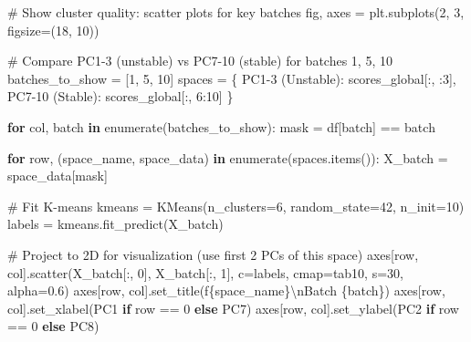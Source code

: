 \documentclass[
  letterpaper,
  DIV=11,
  numbers=noendperiod]{scrartcl}
\newenvironment{Shaded}{\begin{snugshade}}{\end{snugshade}}
\newcommand{\BuiltInTok}[1]{\textcolor[rgb]{0.00,0.23,0.31}{#1}}
\newcommand{\CharTok}[1]{\textcolor[rgb]{0.13,0.47,0.30}{#1}}
\newcommand{\CommentTok}[1]{\textcolor[rgb]{0.37,0.37,0.37}{#1}}
\newcommand{\ControlFlowTok}[1]{\textcolor[rgb]{0.00,0.23,0.31}{\textbf{#1}}}
\newcommand{\DecValTok}[1]{\textcolor[rgb]{0.68,0.00,0.00}{#1}}
\newcommand{\FloatTok}[1]{\textcolor[rgb]{0.68,0.00,0.00}{#1}}
\newcommand{\KeywordTok}[1]{\textcolor[rgb]{0.00,0.23,0.31}{\textbf{#1}}}
\newcommand{\NormalTok}[1]{\textcolor[rgb]{0.00,0.23,0.31}{#1}}
\newcommand{\OperatorTok}[1]{\textcolor[rgb]{0.37,0.37,0.37}{#1}}
\newcommand{\SpecialCharTok}[1]{\textcolor[rgb]{0.37,0.37,0.37}{#1}}
\newcommand{\SpecialStringTok}[1]{\textcolor[rgb]{0.13,0.47,0.30}{#1}}
\newcommand{\StringTok}[1]{\textcolor[rgb]{0.13,0.47,0.30}{#1}}
\renewenvironment{Shaded}{%
  \begin{tcolorbox}[%
    enhanced,%
    colback=codebg,%
    colframe=codebg,%
    borderline west={3pt}{0pt}{sectionblue},%
    fontupper=\small\ttfamily,%
    boxrule=0pt,%
    arc=0pt,%
    boxsep=5pt,%
    left=2mm,%
    right=2mm,%
    top=2mm,%
    bottom=2mm%
  ]%
}{%
  \end{tcolorbox}%
}
\begin{document}
\begin{Shaded}
\begin{Highlighting}[]
\CommentTok{\# Show cluster quality: scatter plots for key batches}
\NormalTok{fig, axes }\OperatorTok{=}\NormalTok{ plt.subplots(}\DecValTok{2}\NormalTok{, }\DecValTok{3}\NormalTok{, figsize}\OperatorTok{=}\NormalTok{(}\DecValTok{18}\NormalTok{, }\DecValTok{10}\NormalTok{))}

\CommentTok{\# Compare PC1{-}3 (unstable) vs PC7{-}10 (stable) for batches 1, 5, 10}
\NormalTok{batches\_to\_show }\OperatorTok{=}\NormalTok{ [}\DecValTok{1}\NormalTok{, }\DecValTok{5}\NormalTok{, }\DecValTok{10}\NormalTok{]}
\NormalTok{spaces }\OperatorTok{=}\NormalTok{ \{}
    \StringTok{\textquotesingle{}PC1{-}3 (Unstable)\textquotesingle{}}\NormalTok{: scores\_global[:, :}\DecValTok{3}\NormalTok{],}
    \StringTok{\textquotesingle{}PC7{-}10 (Stable)\textquotesingle{}}\NormalTok{: scores\_global[:, }\DecValTok{6}\NormalTok{:}\DecValTok{10}\NormalTok{]}
\NormalTok{\}}

\ControlFlowTok{for}\NormalTok{ col, batch }\KeywordTok{in} \BuiltInTok{enumerate}\NormalTok{(batches\_to\_show):}
\NormalTok{    mask }\OperatorTok{=}\NormalTok{ df[}\StringTok{\textquotesingle{}batch\textquotesingle{}}\NormalTok{] }\OperatorTok{==}\NormalTok{ batch}
    
    \ControlFlowTok{for}\NormalTok{ row, (space\_name, space\_data) }\KeywordTok{in} \BuiltInTok{enumerate}\NormalTok{(spaces.items()):}
\NormalTok{        X\_batch }\OperatorTok{=}\NormalTok{ space\_data[mask]}
        
        \CommentTok{\# Fit K{-}means}
\NormalTok{        kmeans }\OperatorTok{=}\NormalTok{ KMeans(n\_clusters}\OperatorTok{=}\DecValTok{6}\NormalTok{, random\_state}\OperatorTok{=}\DecValTok{42}\NormalTok{, n\_init}\OperatorTok{=}\DecValTok{10}\NormalTok{)}
\NormalTok{        labels }\OperatorTok{=}\NormalTok{ kmeans.fit\_predict(X\_batch)}
        
        \CommentTok{\# Project to 2D for visualization (use first 2 PCs of this space)}
\NormalTok{        axes[row, col].scatter(X\_batch[:, }\DecValTok{0}\NormalTok{], X\_batch[:, }\DecValTok{1}\NormalTok{], }
\NormalTok{                              c}\OperatorTok{=}\NormalTok{labels, cmap}\OperatorTok{=}\StringTok{\textquotesingle{}tab10\textquotesingle{}}\NormalTok{, s}\OperatorTok{=}\DecValTok{30}\NormalTok{, alpha}\OperatorTok{=}\FloatTok{0.6}\NormalTok{)}
\NormalTok{        axes[row, col].set\_title(}\SpecialStringTok{f\textquotesingle{}}\SpecialCharTok{\{}\NormalTok{space\_name}\SpecialCharTok{\}}\CharTok{\textbackslash{}n}\SpecialStringTok{Batch }\SpecialCharTok{\{}\NormalTok{batch}\SpecialCharTok{\}}\SpecialStringTok{\textquotesingle{}}\NormalTok{)}
\NormalTok{        axes[row, col].set\_xlabel(}\StringTok{\textquotesingle{}PC1\textquotesingle{}} \ControlFlowTok{if}\NormalTok{ row }\OperatorTok{==} \DecValTok{0} \ControlFlowTok{else} \StringTok{\textquotesingle{}PC7\textquotesingle{}}\NormalTok{)}
\NormalTok{        axes[row, col].set\_ylabel(}\StringTok{\textquotesingle{}PC2\textquotesingle{}} \ControlFlowTok{if}\NormalTok{ row }\OperatorTok{==} \DecValTok{0} \ControlFlowTok{else} \StringTok{\textquotesingle{}PC8\textquotesingle{}}\NormalTok{)}


\end{Highlighting}
\end{Shaded}
\end{document}
